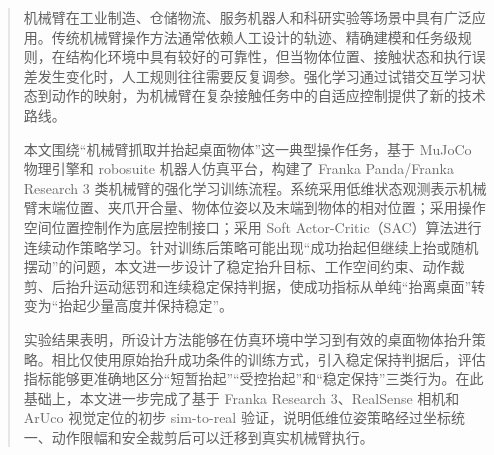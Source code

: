 \documentclass[
    type = bachelor,
    oneside,
    fontset = fandol
]{njuthesis}
\begin{document}
\maketitle
\raggedbottom

\begin{abstract}
机械臂在工业制造、仓储物流、服务机器人和科研实验等场景中具有广泛应用。传统机械臂操作方法通常依赖人工设计的轨迹、精确建模和任务级规则，在结构化环境中具有较好的可靠性，但当物体位置、接触状态和执行误差发生变化时，人工规则往往需要反复调参。强化学习通过试错交互学习状态到动作的映射，为机械臂在复杂接触任务中的自适应控制提供了新的技术路线。

本文围绕“机械臂抓取并抬起桌面物体”这一典型操作任务，基于 MuJoCo 物理引擎和 robosuite 机器人仿真平台，构建了 Franka Panda/Franka Research 3 类机械臂的强化学习训练流程。系统采用低维状态观测表示机械臂末端位置、夹爪开合量、物体位姿以及末端到物体的相对位置；采用操作空间位置控制作为底层控制接口；采用 Soft Actor-Critic（SAC）算法进行连续动作策略学习。针对训练后策略可能出现“成功抬起但继续上抬或随机摆动”的问题，本文进一步设计了稳定抬升目标、工作空间约束、动作裁剪、后抬升运动惩罚和连续稳定保持判据，使成功指标从单纯“抬离桌面”转变为“抬起少量高度并保持稳定”。

实验结果表明，所设计方法能够在仿真环境中学习到有效的桌面物体抬升策略。相比仅使用原始抬升成功条件的训练方式，引入稳定保持判据后，评估指标能够更准确地区分“短暂抬起”“受控抬起”和“稳定保持”三类行为。在此基础上，本文进一步完成了基于 Franka Research 3、RealSense 相机和 ArUco 视觉定位的初步 sim-to-real 验证，说明低维位姿策略经过坐标统一、动作限幅和安全裁剪后可以迁移到真实机械臂执行。

\end{abstract}
\end{document}

